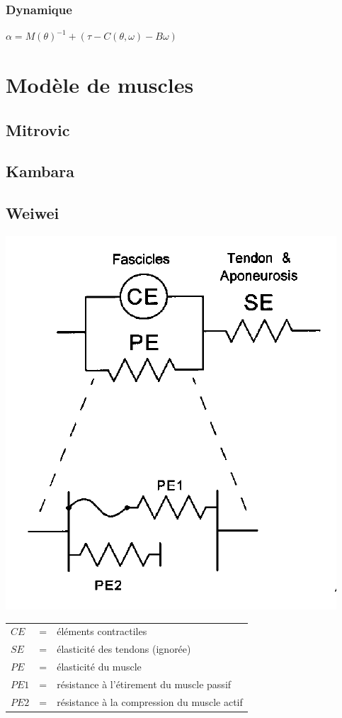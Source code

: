 \documentclass[pdftex,a4paper,11pt]{article}
\begin{document}
\subsubsection{Dynamique}
$\alpha = M(\theta)^{-1} + (\tau - C(\theta, \omega) - B\omega) $



\section{Modèle de muscles}

\subsection{Mitrovic}

\subsection{Kambara}

\subsection{Weiwei}

\begin{center}
        \includegraphics[width=.40\linewidth]{fig/brown}
\end{center}

\begin{tabular}{lcl}
    $CE$  & = & éléments contractiles \\
    $SE$  & = & élasticité des tendons (ignorée) \\
    $PE$  & = & élasticité du muscle \\
    $PE1$ & = & résistance à l'étirement du muscle passif \\
    $PE2$ & = & résistance à la compression du muscle actif \\
\end{tabular}


\end{document}

